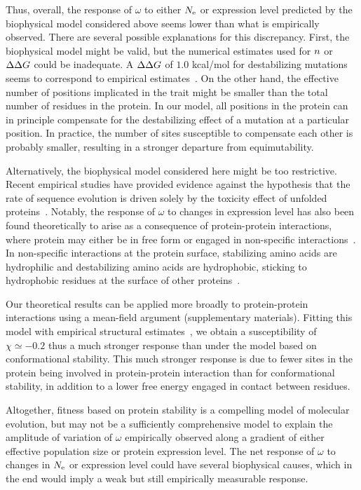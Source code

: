 \documentclass{article}
\begin{document}
Thus, overall, the response of $\omega$ to either $N_{\text{e}}$ or expression level predicted by the biophysical model considered above seems lower than what is empirically observed.
There are several possible explanations for this discrepancy.
First, the biophysical model might be valid, but the numerical estimates used for $n$ or $\Delta \Delta G$ could be inadequate.
A $\Delta \Delta G$ of $1.0$ kcal/mol for destabilizing mutations seems to correspond to empirical estimates~\citep{Zeldovich2007}.
On the other hand, the effective number of positions implicated in the trait might be smaller than the total number of residues in the protein.
In our model, all positions in the protein can in principle compensate for the destabilizing effect of a mutation at a particular position.
In practice, the number of sites susceptible to compensate each other is probably smaller, resulting in a stronger departure from equimutability.

Alternatively, the biophysical model considered here might be too restrictive.
Recent empirical studies have provided evidence against the hypothesis that the rate of sequence evolution is driven solely by the toxicity effect of unfolded proteins~\citep{Plata2017,Razban2019,Biesiadecka2020}.
Notably, the response of $\omega$ to changes in expression level has also been found theoretically to arise as a consequence of protein-protein interactions, where protein may either be in free form or engaged in non-specific interactions~\citep{Yang2012, Zhang2013}.
In non-specific interactions at the protein surface, stabilizing amino acids are hydrophilic and destabilizing amino acids are hydrophobic, sticking to hydrophobic residues at the surface of other proteins~\citep{Dixit2013,Manhart2015}.

Our theoretical results can be applied more broadly to protein-protein interactions using a mean-field argument (supplementary materials).
Fitting this model with empirical structural estimates~\citep{Janin1995a, Zhang2008}, we obtain a susceptibility of $\chi \simeq -0.2$ thus a much stronger response than under the model based on conformational stability.
This much stronger response is due to fewer sites in the protein being involved in protein-protein interaction than for conformational stability, in addition to a lower free energy engaged in contact between residues.

Altogether, fitness based on protein stability is a compelling model of molecular evolution, but may not be a sufficiently comprehensive model to explain the amplitude of variation of $\omega$ empirically observed along a gradient of either {effective population size} or protein expression level.
The net response of $\omega$ to changes in $N_{\text{e}}$ or expression level could have several biophysical causes, which in the end would imply a weak but still empirically measurable response.
\end{document}
